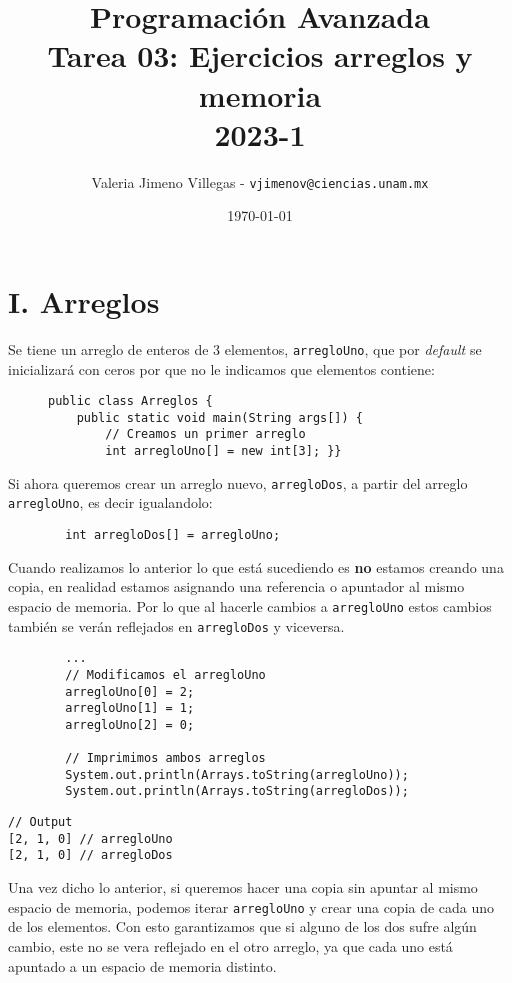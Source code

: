 \documentclass[11pt, oneside]{article}
\title{Programación Avanzada \\[5pt] \normalsize Tarea 03: Ejercicios arreglos y memoria \\[5pt] 2023-1 }
\author{Valeria Jimeno Villegas - \texttt{vjimenov@ciencias.unam.mx}}
\date{\today}
\begin{document}
\maketitle

\section*{I. Arreglos}

Se tiene un arreglo de enteros de 3 elementos, {\tt arregloUno}, que por {\it default} se inicializará con ceros por que no le indicamos que elementos contiene:


\begin{figure}[H]
\centering
\begin{verbatim}
public class Arreglos {
	public static void main(String args[]) {
		// Creamos un primer arreglo
		int arregloUno[] = new int[3]; }}
\end{verbatim}
\end{figure}

Si ahora queremos crear un arreglo nuevo, {\tt arregloDos}, a partir del arreglo {\tt arregloUno}, es decir igualandolo:

\begin{verbatim}
		int arregloDos[] = arregloUno;
\end{verbatim}

Cuando realizamos lo anterior lo que está sucediendo es {\bf no} estamos creando una copia, en realidad estamos asignando una referencia o apuntador al mismo espacio de memoria. Por lo que al hacerle cambios a {\tt arregloUno} estos cambios también se verán reflejados en {\tt arregloDos} y viceversa.

\begin{verbatim}
		...
		// Modificamos el arregloUno
		arregloUno[0] = 2;
		arregloUno[1] = 1;
		arregloUno[2] = 0;

		// Imprimimos ambos arreglos
		System.out.println(Arrays.toString(arregloUno));
		System.out.println(Arrays.toString(arregloDos));
\end{verbatim}
\begin{verbatim}
// Output
[2, 1, 0] // arregloUno
[2, 1, 0] // arregloDos
\end{verbatim}


Una vez dicho lo anterior, si queremos hacer una copia sin apuntar al mismo espacio de memoria, podemos iterar {\tt arregloUno} y crear una copia de cada uno de los elementos. Con esto garantizamos que si alguno de los dos sufre algún cambio, este no se vera reflejado en el otro arreglo, ya que cada uno está apuntado a un espacio de memoria distinto.
\end{document}
